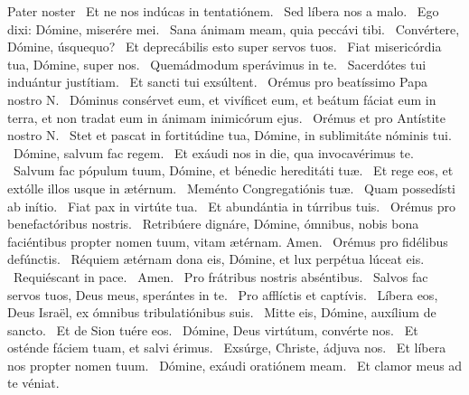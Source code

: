 Pater noster  \V\ Et ne nos indúcas in tentatiónem. \R\ Sed líbera nos a malo. \V\ Ego dixi: Dómine, miserére mei. \R\ Sana ánimam meam, quia peccávi tibi. \V\ Convértere, Dómine, úsquequo? \R\ Et deprecábilis esto super servos tuos. \V\ Fiat misericórdia tua, Dómine, super nos. \R\ Quemádmodum sperávimus in te. \V\ Sacerdótes tui induántur justítiam. \R\ Et sancti tui exsúltent. \V\ Orémus pro beatíssimo Papa nostro N. \R\ Dóminus consérvet eum, et vivíficet eum, et beátum fáciat eum in terra, et non tradat eum in ánimam inimicórum ejus. \V\ Orémus et pro Antístite nostro N. \R\ Stet et pascat in fortitúdine tua, Dómine, in sublimitáte nóminis tui. \V\ Dómine, salvum fac regem. \R\ Et exáudi nos in die, qua invocavérimus te. \V\ Salvum fac pópulum tuum, Dómine, et bénedic hereditáti tuæ. \R\ Et rege eos, et extólle illos usque in ætérnum. \V\ Meménto Congregatiónis tuæ. \R\ Quam possedísti ab inítio. \V\ Fiat pax in virtúte tua. \R\ Et abundántia in túrribus tuis. \V\ Orémus pro benefactóribus nostris. \R\ Retribúere dignáre, Dómine, ómnibus, nobis bona faciéntibus propter nomen tuum, vitam ætérnam. Amen. \V\ Orémus pro fidélibus defúnctis. \R\ Réquiem ætérnam dona eis, Dómine, et lux perpétua lúceat eis. \V\ Requiéscant in pace. \R\ Amen. \V\ Pro frátribus nostris abséntibus. \R\ Salvos fac servos tuos, Deus meus, sperántes in te. \V\ Pro afflíctis et captívis. \R\ Líbera eos, Deus Israël, ex ómnibus tribulatiónibus suis. \V\ Mitte eis, Dómine, auxílium de sancto. \R\ Et de Sion tuére eos. \V\ Dómine, Deus virtútum, convérte nos. \R\ Et osténde fáciem tuam, et salvi érimus. \V\ Exsúrge, Christe, ádjuva nos. \R\ Et líbera nos propter nomen tuum. \V\ Dómine, exáudi oratiónem meam. \R\ Et clamor meus ad te véniat.



